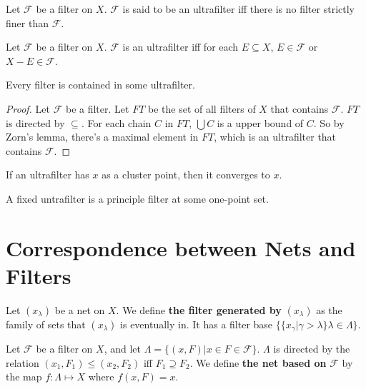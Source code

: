\documentclass[12pt]{book}
\begin{document}
\begin{definition}
	Let $\mathcal F$ be a filter on $X$. $\mathcal F$ is said to be an ultrafilter iff there is no filter strictly finer than $\mathcal F$.
\end{definition}

\begin{theorem}
	Let $\mathcal F$ be a filter on $X$. $\mathcal F$ is an ultrafilter iff for each $E\subseteq X$, $E\in \mathcal F$ or $X-E\in \mathcal F$.
\end{theorem}

\begin{theorem}
	Every filter is contained in some ultrafilter.
\end{theorem}
\begin{proof}
	Let $\mathcal F$ be a filter. Let $FT$ be the set of all filters of $X$ that contains $\mathcal F$. $FT$ is directed by $\subseteq$. For each chain $C$ in $FT$, $\bigcup C$ is a upper bound of $C$. So by Zorn's lemma, there's a maximal element in $FT$, which is an ultrafilter that contains $\mathcal F$.
\end{proof}

\begin{theorem}
	If an ultrafilter has $x$ as a cluster point, then it converges to $x$.
\end{theorem}

\begin{theorem}
	A fixed untrafilter is a principle filter at some one-point set.
\end{theorem}

\section{Correspondence between Nets and Filters}

\begin{definition}
	Let $(x_\lambda)$ be a net on $X$. We define {\bf the filter generated by} $(x_\lambda)$ as the family of sets that $(x_\lambda)$ is eventually in. It has a filter base $\{\{x_\gamma|\gamma>\lambda\}\lambda\in\Lambda\}$.
\end{definition}

\begin{definition}
	Let $\mathcal F$ be a filter on $X$, and let $\Lambda=\{(x,F)|x\in F\in\mathcal F\}$. $\Lambda$ is directed by the relation $(x_1,F_1)\leq (x_2,F_2)$ iff $F_1\supseteq F_2$. We define {\bf the net based on} $\mathcal F$ by the map $f:\Lambda\mapsto X$ where $f(x,F)=x$.
\end{definition}
\end{document}

